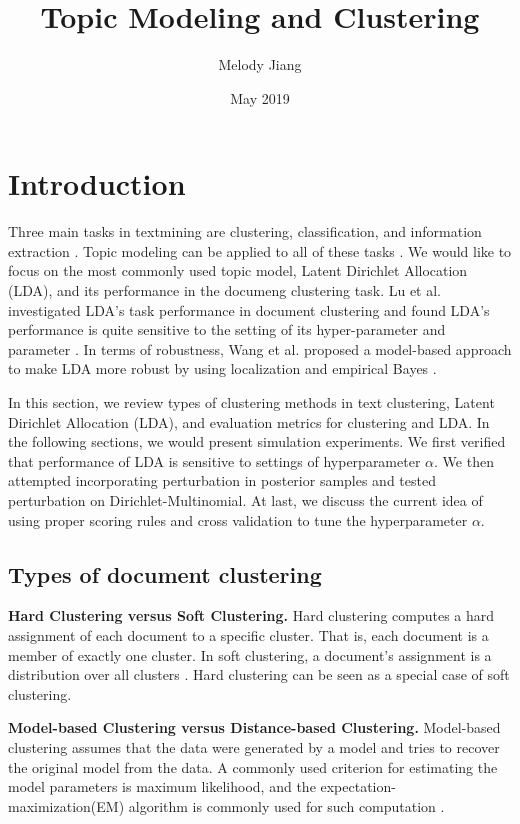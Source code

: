 \documentclass{article}
\title{Topic Modeling and Clustering}
\author{Melody Jiang}
\date{May 2019}
\begin{document}
\maketitle

\tableofcontents



\section{Introduction}

Three main tasks in textmining are clustering, classification, and information extraction \cite{allahyari2017brief}. Topic modeling can be applied to all of these tasks \cite{lu2011investigating}. We would like to focus on the most commonly used topic model, Latent Dirichlet Allocation (LDA), and its performance in the documeng clustering task. Lu et al. investigated LDA's task performance in document clustering and found LDA's performance is quite sensitive to the setting of its hyper-parameter and parameter \cite{lu2011investigating}. In terms of robustness, Wang et al. proposed a model-based approach to make LDA more robust by using localization and empirical Bayes \cite{wang2018general}.

In this section, we review types of clustering methods in text clustering, Latent Dirichlet Allocation (LDA), and evaluation metrics for clustering and LDA. In the following sections, we would present simulation experiments. We first verified that performance of LDA is sensitive to settings of hyperparameter $\alpha$. We then attempted incorporating perturbation in posterior samples and tested perturbation on Dirichlet-Multinomial. At last, we discuss the current idea of using proper scoring rules and cross validation to tune the hyperparameter $\alpha$.


\subsection{Types of document clustering}

\textbf{Hard Clustering versus Soft Clustering.} Hard clustering computes a hard assignment of each document to a specific cluster. That is, each document is a member of exactly one cluster. In soft clustering, a document's assignment is a distribution over all clusters \cite{manning2008iir}. Hard clustering can be seen as a special case of soft clustering.

\textbf{Model-based Clustering versus Distance-based Clustering.} Model-based clustering assumes that the data were generated by a model and tries to recover the original model from the data. A commonly used criterion for estimating the model parameters is maximum likelihood, and the expectation-maximization(EM) algorithm is commonly used for such computation \cite{manning2008iir}.
\end{document}
